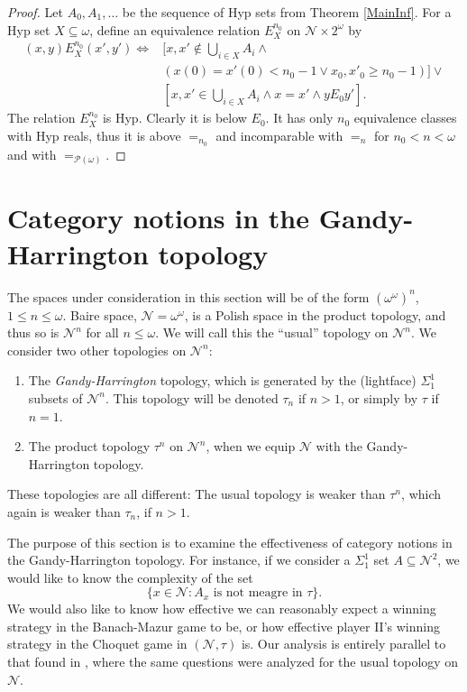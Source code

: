 \documentclass[11pt, english]{article}
\newcommand{\baire}{\mathscr N}
\begin{document}
\begin{proof}
Let $A_0,A_1,\ldots$ be the sequence of Hyp sets from Theorem
\ref{MainInf}. For a Hyp set $X\subseteq\omega$, define an
equivalence relation $E_{X}^{n_0}$ on $\baire\times 2^\omega$ by
\begin{align*}
(x,y) E^{n_0}_{X} (x',y')\iff & [x,x'\notin\bigcup_{i\in X} A_i\wedge \\
&(x(0)=x'(0)<n_0-1\vee x_0,x'_0\geq n_0-1)]\vee\\
& [x,x'\in\bigcup_{i\in X} A_i\wedge x=x'\wedge yE_0 y'].
\end{align*}
The relation $E^{n_0}_X$ is Hyp. Clearly it is below $E_0$. It has
only $n_0$ equivalence classes with Hyp reals, thus it is above
$=_{n_0}$ and incomparable with $=_n$ for $n_0<n<\omega$ and with
$=_{\mathcal{P}(\omega)}$.
\end{proof}


\section{Category notions in the Gandy-Harrington topology}

The spaces under consideration in this section will be of the form
$(\omega^\omega)^n$, $1\leq n\leq\omega$. Baire space,
$\baire=\omega^\omega$, is a Polish space in the product topology,
and thus so is $\baire^n$ for all $n\leq\omega$. We will call this
the ``usual'' topology on $\baire^n$. We consider two other topologies on $\baire^n$:
\begin{enumerate}[(1)]
\item The {\it Gandy-Harrington} topology, which is generated by
the (lightface) $\Sigma^1_1$ subsets of $\baire^n$. This topology
will be denoted $\tau_n$ if $n>1$, or simply by $\tau$ if $n=1$.
\item The product topology $\tau^n$ on $\baire^n$, when we equip
$\baire$ with the Gandy-Harrington topology.
\end{enumerate}

These topologies are all different: The usual topology is weaker
than $\tau^n$, which again is weaker than $\tau_n$, if $n>1$.

The purpose of this section is to examine the effectiveness of
category notions in the Gandy-Harrington topology. For instance,
if we consider a $\Sigma^1_1$ set $A\subseteq \baire^2$, we would
like to know the complexity of the set
$$
\{x\in\baire: A_x\text{ is not meagre in }\tau\}.
$$
We would also like to know how effective we can reasonably expect
a winning strategy in the Banach-Mazur game to be, or how
effective player II's winning strategy in the Choquet game in
$(\baire,\tau)$ is. Our analysis is entirely parallel to that
found in \cite{kechris73}, where the same questions were analyzed
for the usual topology on $\baire$.
\end{document}
